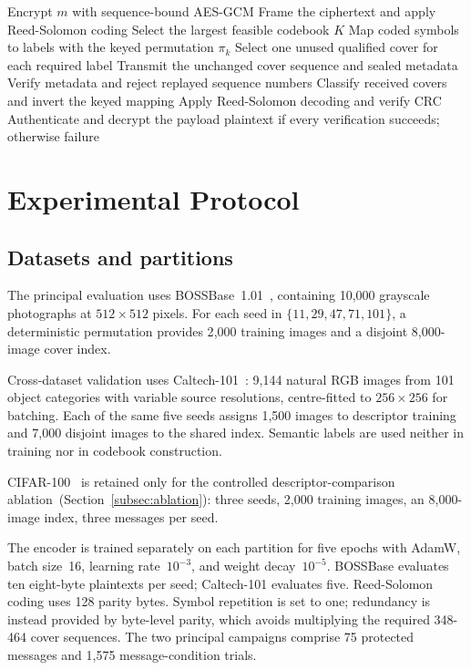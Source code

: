 \documentclass[10pt,journal]{IEEEtran}
\newcommand{\method}{NARCIS\xspace}
\begin{document}
\begin{algorithm}[t]
\caption{\method protected coverless transmission}
\label{alg:narcis}
Encrypt $m$ with sequence-bound AES-GCM\;
Frame the ciphertext and apply Reed-Solomon coding\;
Select the largest feasible codebook $K$\;
Map coded symbols to labels with the keyed permutation $\pi_k$\;
Select one unused qualified cover for each required label\;
Transmit the unchanged cover sequence and sealed metadata\;
Verify metadata and reject replayed sequence numbers\;
Classify received covers and invert the keyed mapping\;
Apply Reed-Solomon decoding and verify CRC\;
Authenticate and decrypt the payload\;
\Return plaintext if every verification succeeds; otherwise failure\;
\end{algorithm}

\section{Experimental Protocol}
\label{sec:experiments}

\subsection{Datasets and partitions}
\label{subsec:datasets}

The principal evaluation uses BOSSBase~1.01~\cite{bas2011boss},
containing 10{,}000 grayscale photographs at $512\times512$ pixels.
For each seed in $\{11,29,47,71,101\}$, a deterministic permutation
provides 2{,}000 training images and a disjoint 8{,}000-image cover
index.

Cross-dataset validation uses Caltech-101~\cite{fei2004caltech}:
9{,}144 natural RGB images from 101 object categories with variable
source resolutions, centre-fitted to $256\times256$ for batching. Each
of the same five seeds assigns 1{,}500 images to descriptor training
and 7{,}000 disjoint images to the shared index. Semantic labels are
used neither in training nor in codebook construction.

CIFAR-100~\cite{krizhevsky2009cifar} is retained only for the
controlled descriptor-comparison ablation~(Section~\ref{subsec:ablation}):
three seeds, 2{,}000 training images, an 8{,}000-image index, three
messages per seed.

The encoder is trained separately on each partition for five epochs
with AdamW, batch size~16, learning rate~$10^{-3}$, and weight
decay~$10^{-5}$. BOSSBase evaluates ten eight-byte plaintexts per
seed; Caltech-101 evaluates five. Reed-Solomon coding uses 128 parity
bytes. Symbol repetition is set to one; redundancy is instead provided
by byte-level parity, which avoids multiplying the required 348-464
cover sequences. The two principal campaigns comprise 75 protected
messages and 1{,}575 message-condition trials.
\end{document}
